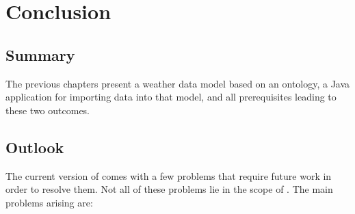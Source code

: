 \chapter{Conclusion}
\label{ch:conclusion}



\section{Summary}

The previous chapters present a weather data model based on an  ontology, a Java application for importing data into that model, and all prerequisites leading to these two outcomes.

\begin{comment}

The previous chapters presented blah blah. Chapter ? summarized the current state of the art, chapter ? gave an overview of commonly used 

The result of the thesis is \thinkhomeweather, a weather data model for use within \thinkhome. It features  %

Additionally, the \emph{Weather Importer} which is presented in chapter ? represents a modular Java project for importing weather data from a weather service via Internet into an object-oriented data model. The data can then be filled into the \thinkhomeweather ontology for %


\end{comment}

\section{Outlook}

The current version of \thinkhomeweather comes with a few problems that require future work in order to resolve them. Not all of these problems lie in the scope of \thinkhomeweather. The main problems arising are:

